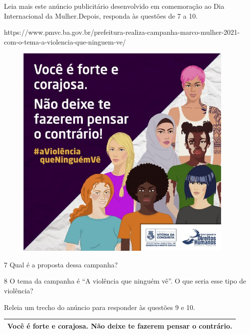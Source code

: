 \begin{itemize}
\begin{itemize}
Leia mais este anúncio publicitário desenvolvido em comemoração ao Dia
Internacional da Mulher.Depois, responda às questões de 7 a 10.

https://www.pmvc.ba.gov.br/prefeitura-realiza-campanha-marco-mulher-2021-com-o-tema-a-violencia-que-ninguem-ve/

\begin{figure}
\centering
\includegraphics[width=4.19722in,height=4.19722in]{./_SAEB_9_POR/media/image21.jpeg}
\caption{}
\end{figure}

\num{7} Qual é a proposta dessa campanha? 

\num{8} O tema da campanha é ``A violência que ninguém vê''. O que seria
esse tipo de violência? 

Releia um trecho do anúncio para responder às questões 9 e 10.

\begin{longtable}[]{@{}l@{}}
\toprule
Você é forte e corajosa. Não deixe te fazerem pensar o
contrário.\tabularnewline
\bottomrule
\end{longtable}


\end{itemize}
\end{itemize}
